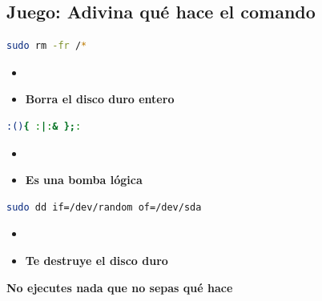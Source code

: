 \documentclass[aspectratio=43]{beamer}
\begin{document}
    \subsection{Juego: Adivina qué hace el comando}
     \begin{frame}[fragile]{\subsecname}{}
        \begin{lstlisting}[language=bash]
sudo rm -fr /*\end{lstlisting}
        \begin{itemize}
            \item {}
            \pause\\
            \item \textbf{Borra el disco duro entero}
        \end{itemize}
        \begin{lstlisting}[language=bash]
:(){ :|:& };:\end{lstlisting}
        \begin{itemize}
            \item {}
            \pause\\
            \item \textbf{Es una bomba lógica}
        \end{itemize}
        \begin{lstlisting}[language=bash]
sudo dd if=/dev/random of=/dev/sda\end{lstlisting}
        \begin{itemize}
            \item {}
            \pause\\
            \item \textbf{Te destruye el disco duro}
        \end{itemize}
        \pause

        \vfill
        \textbf{No ejecutes nada que no sepas qué hace}
    \end{frame}
\end{document}
